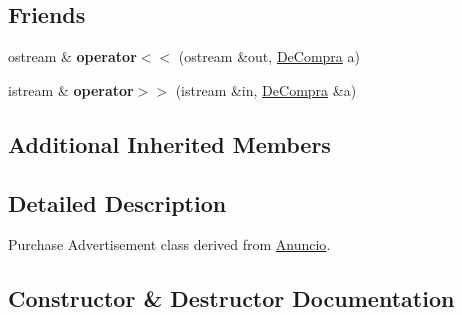 \subsection*{Friends}
\begin{DoxyCompactItemize}
\item 
\hypertarget{class_de_compra_a2b44ab17cc629ebc18bd5ee9fcc2bc42}{}ostream \& {\bfseries operator$<$$<$} (ostream \&out, \hyperlink{class_de_compra}{De\+Compra} a)\label{class_de_compra_a2b44ab17cc629ebc18bd5ee9fcc2bc42}

\item 
\hypertarget{class_de_compra_ad407d344c85e30c8a365165c348c58e3}{}istream \& {\bfseries operator$>$$>$} (istream \&in, \hyperlink{class_de_compra}{De\+Compra} \&a)\label{class_de_compra_ad407d344c85e30c8a365165c348c58e3}

\end{DoxyCompactItemize}
\subsection*{Additional Inherited Members}


\subsection{Detailed Description}
Purchase Advertisement class derived from \hyperlink{class_anuncio}{Anuncio}. 

\subsection{Constructor \& Destructor Documentation}
\hypertarget{class_de_compra_ad83de3818a7e878826e61e920d537252}{}

